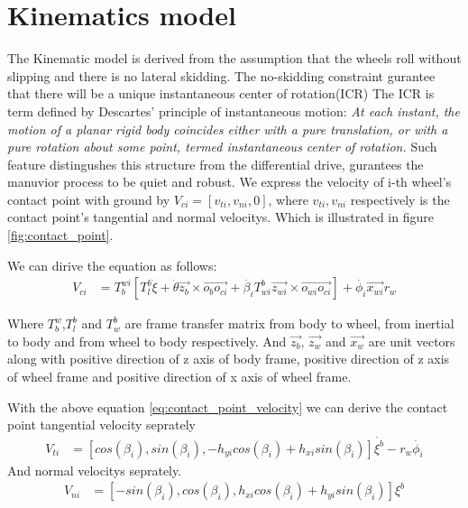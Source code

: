 \section{Kinematics model}
\label{sec:Kinematics}
The Kinematic model is derived from the assumption that the wheels roll without slipping and there is no lateral skidding. The no-skidding constraint gurantee that there will be a unique instantaneous center of rotation(ICR) 
The ICR is term defined by Descartes' principle of instantaneous motion: 
\textit{At each instant, the motion of a planar rigid body coincides either with a pure translation, or with a pure rotation about some point, termed 
instantaneous center of rotation.}
Such feature distingushes this structure from the differential drive, gurantees the manuvior process to be quiet and robust.
We express the velocity of i-th wheel's contact point with ground by $V_{ci}=[v_{ti},v_{ni},0]$, where $v_{ti},v_{ni}$ respectively is the contact point's  tangential and normal velocitys. Which is illustrated in 
figure \cref{fig:contact_point}.



We can dirive the equation as follows:
\begin{equation}\label{eq:contact_point_velocity}
	\begin{split}
	V_{ci} &= T_b^{wi} [T_l^b\dot{\xi} + \dot{\theta}\overrightarrow{z_b}\times\overrightarrow{o_bo_{ci}} + \dot{\beta_i}T_{wi}^b\overrightarrow{z_{wi}}\times\overrightarrow{o_{wi}o_{ci}}] + \dot{\phi_i}\overrightarrow{x_{wi}}r_w
	\end{split}
\end{equation}

Where $T_b^w$,$T_l^b$ and $T_w^b$ are frame transfer matrix from body to wheel, from inertial to body and from wheel to body respectively. And $\overrightarrow{z_b}$, $\overrightarrow{z_w}$ and 
$\overrightarrow{x_w}$ are unit vectors along with positive direction of z axis of body frame, positive direction of z axis of wheel frame and positive direction of x axis of wheel frame.

With the above equation \cref{eq:contact_point_velocity} we can derive the contact point tangential velocity seprately
\begin{equation}\label{eq:contact_point_tangential}
	\begin{split}
	V_{ti} &= [cos(\beta_i), sin(\beta_i), -h_{yi}cos(\beta_i)+h_{xi}sin(\beta_i)]\dot{\xi^b} - r_w\dot{\phi_i}
	\end{split}
\end{equation}
And normal velocitys seprately.
\begin{equation}\label{eq:contact_point_normal}
	\begin{split}
	V_{ni} &= [-sin(\beta_i), cos(\beta_i), h_{xi}cos(\beta_i)+h_{yi}sin(\beta_i)]\xi^b
	\end{split}
\end{equation}

